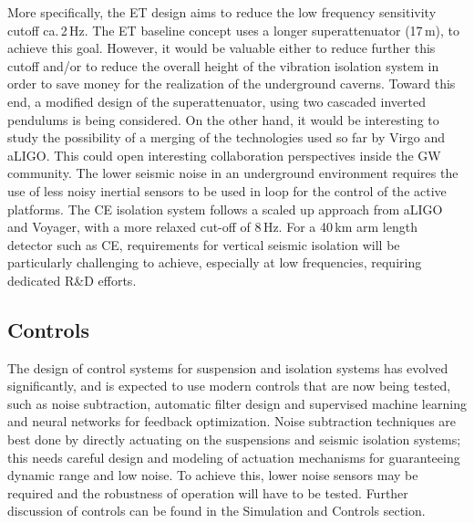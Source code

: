 More specifically, 
the ET design aims to reduce the low frequency sensitivity cutoff ca.\,2\,Hz. 
The ET baseline concept uses a longer superattenuator (17\,m), to achieve this goal. However, it would be valuable either to reduce further this cutoff and/or to reduce the overall height of the vibration isolation system in order to save money for the realization of the underground caverns.
Toward this end, a modified design of the superattenuator, using two cascaded inverted pendulums is being considered. On the other hand, it would be interesting to study the possibility of a merging of the technologies used so far by Virgo and aLIGO. This could open interesting collaboration perspectives inside the GW community.
The lower seismic noise in an underground environment requires the use of less noisy inertial sensors to be used in loop for the control of the active platforms. 
The CE isolation system follows a scaled up approach from aLIGO and Voyager, with a more relaxed cut-off of 8\,Hz. For a 40\,km arm length detector such as CE, requirements for vertical seismic isolation will be particularly challenging to achieve, especially at low frequencies, requiring dedicated R\&D efforts.

\subsection{Controls}

The design of control systems for suspension and isolation systems has evolved significantly, and is expected to use modern controls that are now being tested, such as noise subtraction, automatic filter design and supervised machine learning and neural networks for feedback optimization. 
Noise subtraction techniques are best done 
by directly actuating on the suspensions and seismic isolation systems; this needs careful design and modeling of actuation mechanisms for guaranteeing dynamic range and low noise.  To achieve this, lower noise sensors may be required and the robustness of operation will have to be tested. Further discussion of controls can be found in the Simulation and Controls section.

